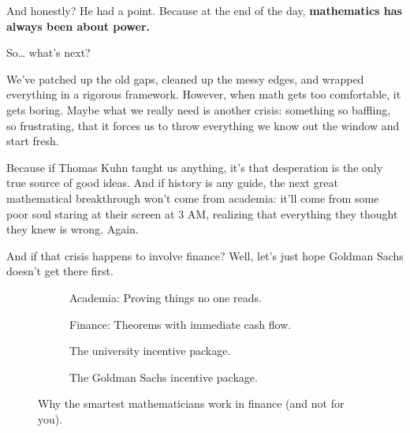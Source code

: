And honestly? He had a point. Because at the end of the day, \textbf{mathematics has always been about power.}

So… what’s next? 

We’ve patched up the old gaps, cleaned up the messy edges, and wrapped everything in a rigorous framework. However, when math gets too comfortable, it gets boring. Maybe what we really need is another crisis: something so baffling, so frustrating, that it forces us to throw everything we know out the window and start fresh. 

Because if Thomas Kuhn taught us anything, it’s that desperation is the only true source of good ideas. And if history is any guide, the next great mathematical breakthrough won’t come from academia: it’ll come from some poor soul staring at their screen at 3 AM, realizing that everything they thought they knew is wrong. Again. 

And if that crisis happens to involve finance? Well, let’s just hope Goldman Sachs doesn’t get there first. 


\begin{figure}[H]
\centering

\begin{subfigure}[t]{0.45\textwidth}
\centering
{}
\caption*{Academia: Proving things no one reads.}
\end{subfigure}
\hfill
\begin{subfigure}[t]{0.45\textwidth}
\centering
{}
\caption*{Finance: Theorems with immediate cash flow.}
\end{subfigure}

\vspace{1em}

\begin{subfigure}[t]{0.45\textwidth}
\centering
{}
\caption*{The university incentive package.}
\end{subfigure}
\hfill
\begin{subfigure}[t]{0.45\textwidth}
\centering
{}
\caption*{The Goldman Sachs incentive package.}
\end{subfigure}

\caption{Why the smartest mathematicians work in finance (and not for you).}
\end{figure}


